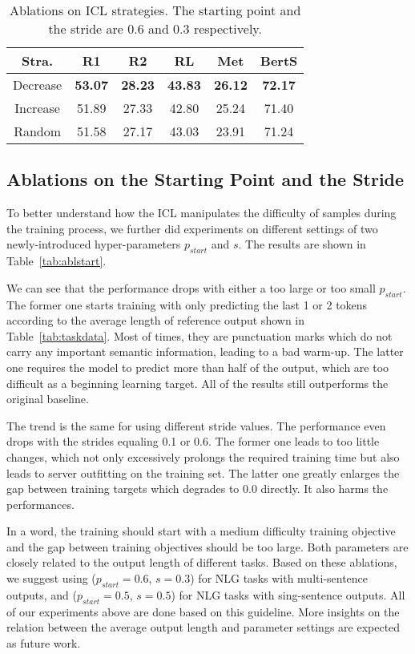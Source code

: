 \begin{table}[th]
	\scriptsize
	\centering
	\begin{tabular}{cccccc}
		\hline
		{Stra.} & {R1} & {R2} & {RL} & {Met} & {BertS} \\
		\hline
		Decrease &\textbf{53.07} & \textbf{28.23} & \textbf{43.83} & \textbf{26.12} & \textbf{72.17}\\
		Increase & 51.89 & 27.33 & 42.80 & 25.24 & 71.40 \\
		Random & 51.58 & 27.17 & 43.03 & 23.91 & 71.24 \\
		\hline
	\end{tabular}
	\caption{Ablations on ICL strategies. The starting point and the stride are 0.6 and 0.3 respectively.}
	\label{tab:ablstrategy}
\end{table}


\subsection{Ablations on the Starting Point and the Stride}

To better understand how the ICL manipulates the difficulty of samples during the training process, we further did experiments on different settings of two newly-introduced hyper-parameters $p_{start}$ and $s$. The results are shown in Table~\ref{tab:ablstart}.

We can see that the performance drops with either a too large or too small $p_{start}$. The former one starts training with only predicting the last 1 or 2 tokens according to the average length of reference output shown in Table~\ref{tab:taskdata}. Most of times, they are punctuation marks which do not carry any important semantic information, leading to a bad warm-up. The latter one requires the model to predict more than half of the output, which are too difficult as a beginning learning target.
All of the results still outperforms the original baseline.

The trend is the same for using different stride values. The performance even drops with the strides equaling 0.1 or 0.6. 
The former one leads to too little changes, which not only excessively prolongs the required training time but also leads to server outfitting on the training set. The latter one greatly enlarges the gap between training targets which degrades to 0.0 directly. It also harms the performances.

In a word, the training should start with a medium difficulty training objective and the gap between training objectives should be too large. Both parameters are closely related to the output length of different tasks. Based on these ablations, we suggest using ($p_{start}=0.6$, $s=0.3$) for NLG tasks with multi-sentence outputs, and ($p_{start}=0.5$, $s=0.5$) for NLG tasks with sing-sentence outputs. All of our experiments above are done based on this guideline. More insights on the relation between the average output length and parameter settings are expected as future work.

